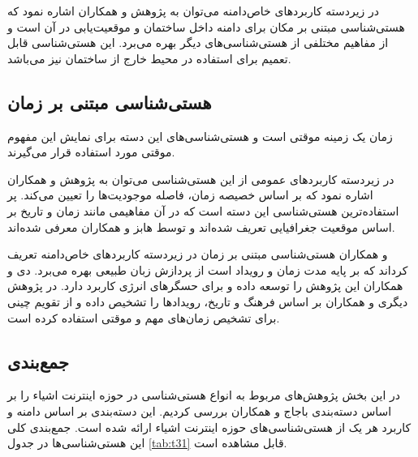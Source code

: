 در زیردسته کاربردهای خاص‌دامنه می‌توان به پژوهش  و همکاران \cite{x232Z33} اشاره نمود که هستی‌شناسی مبتنی بر مکان برای دامنه داخل ساختمان و موقعیت‌یابی در آن است و از مفاهیم مختلفی از هستی‌شناسی‌های دیگر بهره می‌برد. این هستی‌شناسی قابل تعمیم برای استفاده در محیط خارج از ساختمان نیز می‌باشد.

\subsection{هستی‌شناسی مبتنی بر زمان}

زمان یک زمینه موقتی است و هستی‌‌شناسی‌‌های این دسته برای نمايش این مفهوم موقتی مورد استفاده قرار می‌‌گیرند. 

در زیردسته کاربردهای عمومی از این هستی‌شناسی می‌توان به پژوهش  و همکاران \cite{x232Z40} اشاره نمود که بر اساس خصیصه زمان، فاصله موجودیت‌ها را تعیین می‌کند. پر استفاده‌‌ترین هستی‌‌شناسی این دسته  است که در آن مفاهیمی مانند زمان و تاریخ بر اساس موقعیت جغرافیایی تعریف شده‌‌اند و توسط هابز و همکاران \cite{x232Z4} معرفی شده‌اند.

 و همکاران \cite{x232Z41} هستی‌شناسی مبتنی بر زمان در زیردسته کاربردهای خاص‌دامنه‌ تعریف کرد‌اند که بر پایه مدت زمان و رویداد است از پردازش زبان طبیعی بهره می‌برد. دی و همکاران \cite{x232Z42} این پژوهش را توسعه داده و برای حسگرهای انرژی کاربرد دارد. در پژوهش دیگری  و همکاران \cite{x232Z43} بر اساس فرهنگ و تاریخ، رویدادها را تشخیص داده و از تقویم چینی برای تشخیص زمان‌های مهم و موقتی استفاده کرده است.

\subsection{جمع‌بندی}

در این بخش پژوهش‌های مربوط به انواع هستی‌شناسی در حوزه اینترنت اشیاء را بر اساس دسته‌بندی باجاج و همکاران \cite{x232} بررسی کردیم. این دسته‌بندی بر اساس دامنه و کاربرد هر یک از هستی‌شناسی‌های حوزه اینترنت اشیاء ارائه شده است. جمع‌بندی کلی این هستی‌شناسی‌ها در جدول \ref{tab:t31} قابل مشاهده است.


